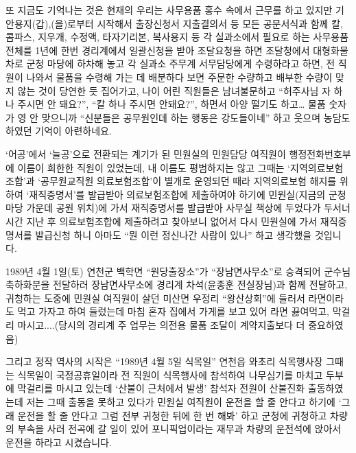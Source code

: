 \documentclass[chapter,book,openany,twoside]{oblivoir}
\begin{document}
또 지금도 기억나는 것은 현재의 우리는 사무용품 홍수 속에서 근무를 하고 있지만 기안용지(갑),(을)로부터 시작해서 출장신청서 지출결의서 등 모든 공문서식과 함께 칼, 콤파스, 지우개, 수정액, 타자기리본, 복사용지 등  각 실과소에서 필요로 하는 사무용품 전체를 1년에 한번 경리계에서 일괄신청을 받아 조달요청을 하면 조달청에서 대형화물차로 군청 마당에 하차해 놓고 각 실과소 주무계 서무담당에게 수령하라고 하면, 전 직원이 나와서 물품을 수령해 가는 데 배분하다 보면 주문한 수량하고 배부한 수량이 맞지 않는 것이 당연한 듯 집어가고, 나이 어린 직원들은 남녀불문하고 ``허주사님 자 하나 주시면 안 돼요?'', ``칼 하나 주시면 안돼요?'', 하면서 아양 떨기도 하고… 물품 숫자가 영 안 맞으니까 ``신분들은 공무원인데 하는 행동은 강도들이네'' 하고 웃으며 농담도 하였던 기억이 아련하네요.

`어공'에서 `늘공'으로 전환되는 계기가 된 민원실의 민원담당 여직원이 행정전화번호부에 이름이 희한한 직원이 있었는데, 내 이름도 평범하지는 않고 그때는 `지역의료보험조합'과 `공무원교직원 의료보험조합'이 별개로 운영되던 때라 지역의료보험 해지를 위하여 `재직증명서'를 발급받아 의료보험조합에 제출하여야 하기에 민원실(지금의 군청마당 가운데 공원 위치)에 가서 재직증명서를 발급받아 사무실 책상에 두었다가 두서너 시간 지난 후 의료보험조합에 제출하려고 찾아보니 없어서 다시 민원실에 가서 재직증명서를 발급신청 하니 아마도 ``뭔 이런 정신나간 사람이 있나'' 하고 생각했을 것입니다.

1989년 4월 1일(토) 연천군 백학면 ``원당출장소''가 ``장남면사무소''로 승격되어 군수님 축하화분을 전달하러 장남면사무소에 경리계 차석(윤종훈 전실장님)과 함께 전달하고, 귀청하는 도중에 민원실 여직원이 살던 미산면 우정리 ``왕산상회''에 들러서 라면이라도 먹고 가자고 하여 들렀는데 마침 혼자 집에서 가게를 보고 있어 라면 끓여먹고, 막걸리 마시고....(당시의 경리계 주 업무는 의전용 물품 조달이 계약지출보다 더 중요하였음)

그리고 정작 역사의 시작은 ``1989년 4월 5일 식목일'' 연천읍 와초리 식목행사장 그때는 식목일이 국정공휴일이라 전 직원이 식목행사에 참석하여 나무심기를 마치고 두부에 막걸리를 마시고 있는데 `산불이 근처에서 발생' 참석자 전원이 산불진화 출동하였는데 저는 그때 출동을 못하고 있다가 민원실 여직원이 운전을 할 줄 안다고 하기에 `그래 운전을 할 줄 안다고 그럼 전부 귀청한 뒤에 한 번 해봐' 하고 군청에 귀청하고 차량의 부속을 사러 전곡에 갈 일이 있어 포니픽업이라는 재무과 차량의 운전석에 앉아서 운전을 하라고 시켰습니다.
\end{document}
